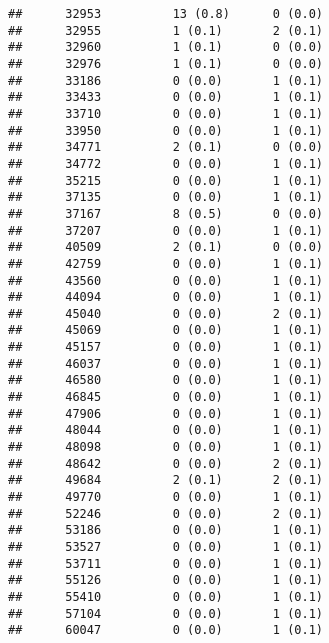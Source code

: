 \documentclass[]{article}
\begin{document}
\begin{verbatim}
##      32953          13 (0.8)      0 (0.0)                        
##      32955          1 (0.1)       2 (0.1)                        
##      32960          1 (0.1)       0 (0.0)                        
##      32976          1 (0.1)       0 (0.0)                        
##      33186          0 (0.0)       1 (0.1)                        
##      33433          0 (0.0)       1 (0.1)                        
##      33710          0 (0.0)       1 (0.1)                        
##      33950          0 (0.0)       1 (0.1)                        
##      34771          2 (0.1)       0 (0.0)                        
##      34772          0 (0.0)       1 (0.1)                        
##      35215          0 (0.0)       1 (0.1)                        
##      37135          0 (0.0)       1 (0.1)                        
##      37167          8 (0.5)       0 (0.0)                        
##      37207          0 (0.0)       1 (0.1)                        
##      40509          2 (0.1)       0 (0.0)                        
##      42759          0 (0.0)       1 (0.1)                        
##      43560          0 (0.0)       1 (0.1)                        
##      44094          0 (0.0)       1 (0.1)                        
##      45040          0 (0.0)       2 (0.1)                        
##      45069          0 (0.0)       1 (0.1)                        
##      45157          0 (0.0)       1 (0.1)                        
##      46037          0 (0.0)       1 (0.1)                        
##      46580          0 (0.0)       1 (0.1)                        
##      46845          0 (0.0)       1 (0.1)                        
##      47906          0 (0.0)       1 (0.1)                        
##      48044          0 (0.0)       1 (0.1)                        
##      48098          0 (0.0)       1 (0.1)                        
##      48642          0 (0.0)       2 (0.1)                        
##      49684          2 (0.1)       2 (0.1)                        
##      49770          0 (0.0)       1 (0.1)                        
##      52246          0 (0.0)       2 (0.1)                        
##      53186          0 (0.0)       1 (0.1)                        
##      53527          0 (0.0)       1 (0.1)                        
##      53711          0 (0.0)       1 (0.1)                        
##      55126          0 (0.0)       1 (0.1)                        
##      55410          0 (0.0)       1 (0.1)                        
##      57104          0 (0.0)       1 (0.1)                        
##      60047          0 (0.0)       1 (0.1)                        

\end{verbatim}
\end{document}
